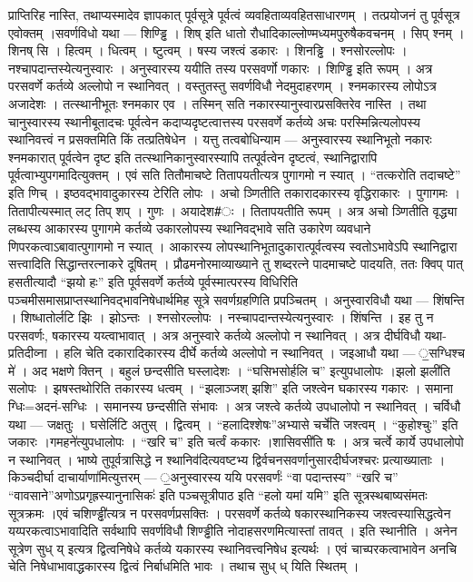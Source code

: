 प्राप्तिरिह नास्ति, तथाप्यस्मादेव ज्ञापकात् पूर्वसूत्रे पूर्वत्वं
व्यवहिताव्यवहितसाधारणम् । तत्प्रयोजनं तु पूर्वसूत्र एवोक्तम् ।सवर्णविधो
यथा --- शिण्ड्ढि । शिष् इति धातो रौधादिकाल्लोण्मध्यमपुरुषैकवचनम् । सिप्
श्नम् । शिनष् सि । हित्वम् । धित्वम् । ष्टुत्वम् । षस्य जश्त्वं डकारः ।
शिनड्ढि । श्नसोरल्लोपः । नश्चापदान्तस्येत्यनुस्वारः । अनुस्वारस्य ययीति
तस्य परसवर्णो णकारः । शिण्ड्ढि इति रूपम् । अत्र परसवर्णे कर्तव्ये
अल्लोपो न स्थानिवत् । वस्तुतस्तु सवर्णविधौ नेदमुदाहरणम् । श्नमकारस्य
लोपोऽत्र अजादेशः । तत्स्थानीभूतः श्नमकार एव । तस्मिन् सति
नकारस्यानुस्वारप्रसक्तिरेव नास्ति । तथा चानुस्वारस्य स्थानीबूतादचः
पूर्वत्वेन कदाप्यदृष्टत्वात्तस्य परसवर्णे कर्तव्ये अचः
परस्मिन्नित्यलोपस्य स्थानिवत्त्वं न प्रसक्तमिति किं तत्प्रतिषेधेन ।
यत्तु तत्वबोधिन्याम --- अनुस्वारस्य स्थानिभूतो नकारः श्नमकारात्
पूर्वत्वेन दृष्ट इति तत्स्थानिकानुस्वारस्यापि तत्पूर्वत्वेन दृष्टत्वं,
स्थानिद्वारापि पूर्वत्वाभ्युपगमादित्युक्तम् । एवं सति तितौमाचष्टे
तितापयतीत्यत्र पुगागमो न स्यात् । ``तत्करोति तदाचष्टे'' इति णिच् ।
इष्ठवद्भावादुकारस्य टेरिति लोपः । अचो ञ्णितीति तकारादकारस्य वृद्धिराकारः
। पुगागमः । तितापीत्यस्मात् लट् तिप् शप् । गुणः । अयादेश\#ः । तितापयतीति
रूपम् । अत्र अचो ञ्णितीति वृद्ध्या लब्धस्य आकारस्य पुगागमे कर्तव्ये
उकारलोपस्य स्थानिवद्भावे सति उकारेण व्यवधाने णिपरकत्वाऽबावात्पुगागमो न
स्यात् । आकारस्य लोपस्थानिभूतादुकारात्पूर्वत्वस्य स्वतोऽभावेऽपि
स्थानिद्वारा सत्त्वादिति सिद्धान्तरत्नाकरे दूषितम् ।
प्रौढमनोरमाव्याख्याने तु शब्दरत्ने पादमाचष्टे पादयति, ततः क्विप् पात्
हसतीत्यादौ ``झयो हः'' इति पूर्वसवर्णे कर्तव्ये पूर्वस्मात्परस्य विधिरिति
पञ्चमीसमासप्राप्तस्थानिवद्भावनिषेधार्थमिह सूत्रे सवर्णग्रहणिति
प्रपञ्चितम् । अनुस्वारविधौ यथा --- शिंषन्ति । शिष्धातोर्लटि झिः ।
झोऽन्तः । श्नसोरल्लोपः । नस्चापदान्तस्येत्यनुस्वारः । शिंषन्ति । इह तु न
परसवर्णः, षकारस्य यय्त्वाभावात् । अत्र अनुस्वारे कर्तव्ये अल्लोपो न
स्थानिवत् । अत्र दीर्घविधौ यथा-प्रतिदीव्ना । हलि चेति दकारादिकारस्य
दीर्घे कर्तव्ये अल्लोपो न स्थानिवत् । जइआधौ यथा --- ॒सग्धिश्च मे॑ । अद
भक्षणे क्तिन् । बहुलं छन्दसीति घस्लादेशः । ``घसिभसोर्हलि च''
इत्युपधालोपः ।झलो झली॑ति सलोपः । झषस्तथोरिति तकारस्य धत्वम् । ``झलाञ्जश्
झशि'' इति जश्त्वेन घकारस्य गकारः । समाना ग्धिः=अदनं-सग्धिः । समानस्य
छन्दसीति संभावः । अत्र जश्त्वे कर्तव्ये उपधालोपो न स्थानिवत् । चर्विधौ
यथा --- जक्षतुः । घसेर्लिटि अतुस् । द्वित्वम् । ``हलादिश्शेषः''अभ्यासे
चर्चे॑ति जश्त्वम् । ``कुहोश्चुः'' इति जकारः ।गमहने॑त्युपधालोपः । ``खरि
च'' इति चर्त्वं ककारः ।शासिवसी॑ति षः । अत्र चर्त्वे कार्ये उपधालोपो न
स्थानिवत् । भाष्ये तुपूर्वत्रासिद्धे न श्थानिव॑दित्यवष्टभ्य
द्विर्वचनसवर्णानुसारदीर्घजश्चरः प्रत्याख्याताः । किञ्चदीर्घा
दाचार्याणा॑मित्युत्तरम् --- ॒अनुस्वारस्य ययि परसवर्णः॑ ``वा पदान्तस्य''
``खरि च'' ``वावसाने''अणोऽप्रगृह्रस्यानुनासिकः॑ इति पञ्चसूत्रीपाठ इति
``हलो यमां यमि'' इति सूत्रस्थबाष्यसंमतः सूत्रक्रमः ।एवं चशिण्ड्ढी॑त्यत्र
न परसवर्णप्रसक्तिः । परसवर्णे कर्तव्ये षकारस्थानिकस्य
जश्त्वस्यासिद्धत्वेन यय्परकत्वाऽभावादिति सर्वथापि सवर्णविधौ शिण्ड्ढीति
नोदाहसरणमित्यास्तां तावत् । इति स्थानीति । अनेन सूत्रेण सुध् य् इत्यत्र
द्वित्वनिषेधे कर्तव्ये यकारस्य स्थानिवत्त्वनिषेध इत्यर्थः । एवं
चाच्परकत्वाभावेन अनचि चेति निषेधाभावाद्धकारस्य द्वित्वं निर्बाधमिति भावः
। तथाच सुध् ध् यिति स्थितम् ।
